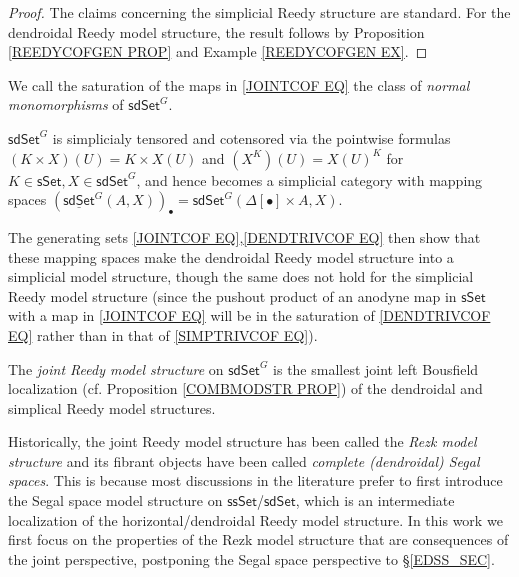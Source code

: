 \documentclass[a4paper,10pt
 ,draft
]{article}%
\begin{document}
\begin{proof}
The claims concerning the simplicial Reedy structure are standard. For the dendroidal Reedy model structure, the result follows by Proposition \ref{REEDYCOFGEN PROP} and Example \ref{REEDYCOFGEN EX}. 
%	
\end{proof}


We call the saturation of the maps in \eqref{JOINTCOF EQ} the class of \textit{normal monomorphisms} of $\mathsf{sdSet}^G$.


\begin{remark}\label{MAPSPACE REM}
$\mathsf{sdSet}^G$ is simplicialy tensored and cotensored via the pointwise 
formulas $(K \times X)(U) = K \times X(U)$ and
$\left(X^K\right)(U) = X(U)^K$
for $K \in \mathsf{sSet}, X \in \mathsf{sdSet}^G$, 
and hence becomes a simplicial category with mapping spaces
$\left(\underline{\mathsf{sdSet}}^G(A,X)\right)_{\bullet} = \mathsf{sdSet}^G(\Delta[\bullet] \times A,X)$.

The generating sets \eqref{JOINTCOF EQ},\eqref{DENDTRIVCOF EQ} then show that these mapping spaces make the dendroidal Reedy model structure into a simplicial model structure, though the same does not hold for the simplicial Reedy model structure
(since the pushout product of an anodyne map in $\mathsf{sSet}$ with a map in \eqref{JOINTCOF EQ} will be in the saturation of \eqref{DENDTRIVCOF EQ} rather than in that of \eqref{SIMPTRIVCOF EQ}).
\end{remark}


\begin{definition}\label{JOINREED DEF}
The \textit{joint Reedy model structure} on $\mathsf{sdSet}^G$ is the smallest joint left Bousfield localization (cf. Proposition \ref{COMBMODSTR PROP}) of the dendroidal and simplical Reedy model structures.
\end{definition}


\begin{remark}\label{JOINREED REM}
Historically, the joint Reedy model structure has been called the \textit{Rezk model structure} and its fibrant objects have been called 
\textit{complete (dendroidal) Segal spaces}.
This is because most discussions in the literature 
\cite{Rez01,CM13a}
prefer to first introduce the Segal space model structure on
$\mathsf{ssSet}$/$\mathsf{sdSet}$, which is an intermediate localization of the 
horizontal/dendroidal Reedy model structure.
In this work we first focus on the properties of the Rezk model structure that are consequences of the joint perspective, 
postponing the Segal space perspective to \S \ref{EDSS_SEC}.
\end{remark}
\end{document}
